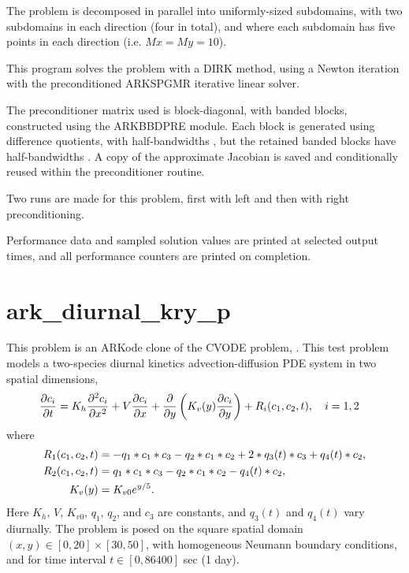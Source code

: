 \documentclass[letterpaper,10pt,english]{sphinxmanual}
\begin{document}
The problem is decomposed in parallel into uniformly-sized subdomains,
with two subdomains in each direction (four in total), and where each
subdomain has five points in each direction (i.e. $Mx=My=10$).

This program solves the problem with a DIRK method, using a Newton
iteration with the preconditioned ARKSPGMR iterative linear solver.

The preconditioner matrix used is block-diagonal, with banded blocks,
constructed using the ARKBBDPRE module.  Each block is generated using
difference quotients, with half-bandwidths , but
the retained banded blocks have half-bandwidths .
A copy of the approximate Jacobian is saved and conditionally reused
within the preconditioner routine.

Two runs are made for this problem, first with left and then with
right preconditioning.

Performance data and sampled solution values are printed at
selected output times, and all performance counters are printed
on completion.


\chapter{ark\_diurnal\_kry\_p}
\label{ark_diurnal_kry_p:id1}\label{ark_diurnal_kry_p::doc}\label{ark_diurnal_kry_p:ark-diurnal-kry-p}
This problem is an ARKode clone of the CVODE problem,
.  This test problem models a two-species
diurnal kinetics advection-diffusion PDE system in two spatial
dimensions,
\begin{gather}
\begin{split}\frac{\partial c_i}{\partial t} &=
  K_h \frac{\partial^2 c_i}{\partial x^2} +
  V \frac{\partial     c_i}{\partial x} +
  \frac{\partial}{\partial y}\left( K_v(y)
  \frac{\partial c_i}{\partial y}\right) +
  R_i(c_1,c_2,t),\quad i=1,2\end{split}\notag
\end{gather}
where
\begin{gather}
\begin{split}R_1(c_1,c_2,t) &= -q_1*c_1*c_3 - q_2*c_1*c_2 + 2*q_3(t)*c_3 + q_4(t)*c_2, \\
R_2(c_1,c_2,t) &=  q_1*c_1*c_3 - q_2*c_1*c_2 - q_4(t)*c_2, \\
K_v(y) &= K_{v0} e^{y/5}.\end{split}\notag
\end{gather}
Here $K_h$, $V$, $K_{v0}$, $q_1$, $q_2$,
and $c_3$ are constants, and $q_3(t)$ and $q_4(t)$
vary diurnally.  The problem is posed on the square spatial domain
$(x,y) \in [0,20]\times[30,50]$, with homogeneous Neumann
boundary conditions, and for time interval $t\in [0,86400]$ sec
(1 day).
\end{document}
